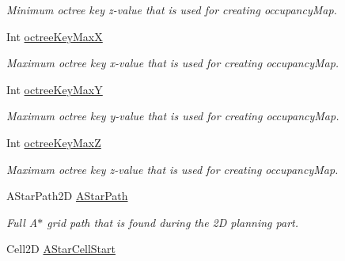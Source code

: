 \begin{DoxyCompactItemize}
\begin{DoxyCompactList}\small\item\em Minimum octree key z-\/value that is used for creating occupancy\-Map. \end{DoxyCompactList}\item 
\hypertarget{classSquirrelMotionPlanner_1_1Planner_af96fecbdc43020d174368caba84abda9}{Int \hyperlink{classSquirrelMotionPlanner_1_1Planner_af96fecbdc43020d174368caba84abda9}{octree\-Key\-Max\-X}}\label{classSquirrelMotionPlanner_1_1Planner_af96fecbdc43020d174368caba84abda9}

\begin{DoxyCompactList}\small\item\em Maximum octree key x-\/value that is used for creating occupancy\-Map. \end{DoxyCompactList}\item 
\hypertarget{classSquirrelMotionPlanner_1_1Planner_a24019af948c378b311798311bff9328f}{Int \hyperlink{classSquirrelMotionPlanner_1_1Planner_a24019af948c378b311798311bff9328f}{octree\-Key\-Max\-Y}}\label{classSquirrelMotionPlanner_1_1Planner_a24019af948c378b311798311bff9328f}

\begin{DoxyCompactList}\small\item\em Maximum octree key y-\/value that is used for creating occupancy\-Map. \end{DoxyCompactList}\item 
\hypertarget{classSquirrelMotionPlanner_1_1Planner_a6107429acc8e0d32c1508a33f690bcef}{Int \hyperlink{classSquirrelMotionPlanner_1_1Planner_a6107429acc8e0d32c1508a33f690bcef}{octree\-Key\-Max\-Z}}\label{classSquirrelMotionPlanner_1_1Planner_a6107429acc8e0d32c1508a33f690bcef}

\begin{DoxyCompactList}\small\item\em Maximum octree key z-\/value that is used for creating occupancy\-Map. \end{DoxyCompactList}\item 
\hypertarget{classSquirrelMotionPlanner_1_1Planner_aa789bbca3cfa5c0f71b73f2c912e3cfb}{A\-Star\-Path2\-D \hyperlink{classSquirrelMotionPlanner_1_1Planner_aa789bbca3cfa5c0f71b73f2c912e3cfb}{A\-Star\-Path}}\label{classSquirrelMotionPlanner_1_1Planner_aa789bbca3cfa5c0f71b73f2c912e3cfb}

\begin{DoxyCompactList}\small\item\em Full A$\ast$ grid path that is found during the 2\-D planning part. \end{DoxyCompactList}\item 
\hypertarget{classSquirrelMotionPlanner_1_1Planner_a73e28409a7e36fd48fe696cd748540d0}{Cell2\-D \hyperlink{classSquirrelMotionPlanner_1_1Planner_a73e28409a7e36fd48fe696cd748540d0}{A\-Star\-Cell\-Start}}\label{classSquirrelMotionPlanner_1_1Planner_a73e28409a7e36fd48fe696cd748540d0}


\end{DoxyCompactItemize}
